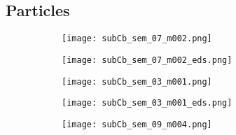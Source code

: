 \subsection{Particles}

\begin{figure}
    \centering
    \begin{subfigure}[t]{\textwidth}
          \begin{minipage}[t]{0.43\linewidth}
            \centering
            \texttt{[image: subCb\_sem\_07\_m002.png]}
          \end{minipage}
          \hfill
          \begin{minipage}[t]{0.43\linewidth}
            \centering
            \texttt{[image: subCb\_sem\_07\_m002\_eds.png]}
          \end{minipage}
          \begin{minipage}[t]{0.11\linewidth}
            \centering
            \atomicTable[&][&][&]
          \end{minipage}
        \caption{}\label{fig:subCb_silica}
    \end{subfigure}
    \par\bigskip
    \begin{subfigure}[t]{\textwidth}
          \begin{minipage}[t]{0.43\linewidth}
            \centering
            \texttt{[image: subCb\_sem\_03\_m001.png]}
          \end{minipage}
          \hfill
          \begin{minipage}[t]{0.43\linewidth}
            \centering
            \texttt{[image: subCb\_sem\_03\_m001\_eds.png]}
          \end{minipage}
          \begin{minipage}[t]{0.11\linewidth}
            \centering
            \atomicTable[&][&][&]
          \end{minipage}
        \caption{}\label{fig:subCb_Br-etch}
    \end{subfigure}
    \par\bigskip
    \begin{subfigure}[t]{\textwidth}
          \begin{minipage}[t]{0.43\linewidth}
            \centering
            \texttt{[image: subCb\_sem\_09\_m004.png]}
          \end{minipage}
          \hfill
          \begin{minipage}[t]{0.43\linewidth}

\end{minipage}
\end{subfigure}
\end{figure}
